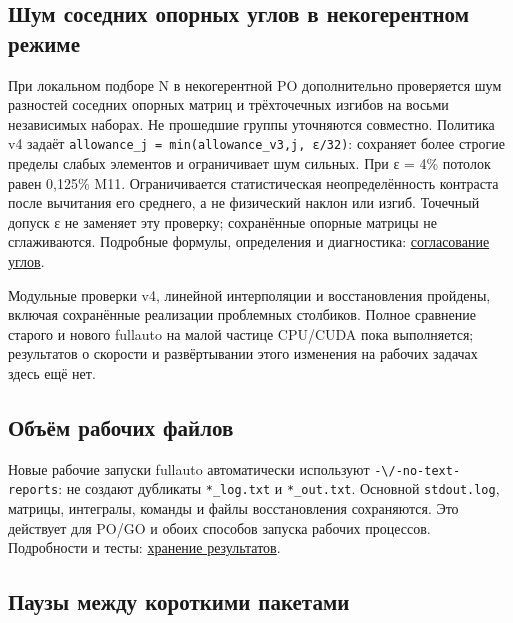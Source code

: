 \subsection{Шум соседних опорных углов в некогерентном
режиме}\label{ux448ux443ux43c-ux441ux43eux441ux435ux434ux43dux438ux445-ux43eux43fux43eux440ux43dux44bux445-ux443ux433ux43bux43eux432-ux432-ux43dux435ux43aux43eux433ux435ux440ux435ux43dux442ux43dux43eux43c-ux440ux435ux436ux438ux43cux435}

При локальном подборе N в некогерентной PO дополнительно проверяется шум
разностей соседних опорных матриц и трёхточечных изгибов на восьми
независимых наборах. Не прошедшие группы уточняются совместно. Политика
v4 задаёт \texttt{allowance\_j\ =\ min(allowance\_v3,j,\ ε/32)}:
сохраняет более строгие пределы слабых элементов и ограничивает шум
сильных. При ε = 4\% потолок равен 0,125\% M11. Ограничивается
статистическая неопределённость контраста после вычитания его среднего,
а не физический наклон или изгиб. Точечный допуск ε не заменяет эту
проверку; сохранённые опорные матрицы не сглаживаются. Подробные
формулы, определения и диагностика:
\href{FULLAUTO_ANGULAR_SAMPLING_RU.md}{согласование углов}.

Модульные проверки v4, линейной интерполяции и восстановления пройдены,
включая сохранённые реализации проблемных столбиков. Полное сравнение
старого и нового fullauto на малой частице CPU/CUDA пока выполняется;
результатов о скорости и развёртывании этого изменения на рабочих
задачах здесь ещё нет.

\subsection{Объём рабочих
файлов}\label{ux43eux431ux44aux451ux43c-ux440ux430ux431ux43eux447ux438ux445-ux444ux430ux439ux43bux43eux432}

Новые рабочие запуски fullauto автоматически используют
\nolinkurl{-\/-no-text-reports}: не создают дубликаты \nolinkurl{*_log.txt} и
\nolinkurl{*_out.txt}. Основной \texttt{stdout.log}, матрицы, интегралы,
команды и файлы восстановления сохраняются. Это действует для PO/GO и
обоих способов запуска рабочих процессов. Подробности и тесты:
\href{FULLAUTO_STORAGE_RU.md}{хранение результатов}.

\subsection{Паузы между короткими
пакетами}\label{ux43fux430ux443ux437ux44b-ux43cux435ux436ux434ux443-ux43aux43eux440ux43eux442ux43aux438ux43cux438-ux43fux430ux43aux435ux442ux430ux43cux438}

